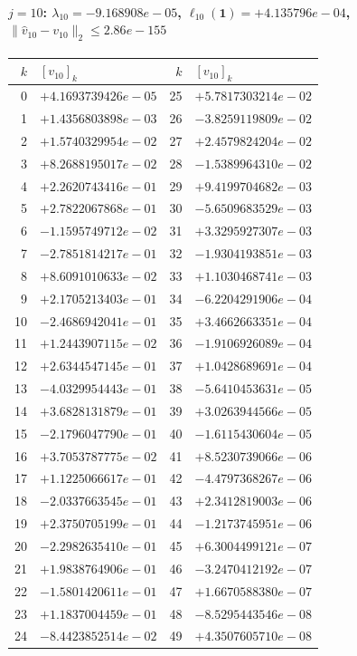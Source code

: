 \documentclass[11pt]{article}
\begin{document}
\paragraph{$j = 10$: $\lambda_{10} = -9.168908e-05$, \quad $\ell_{10}(\mathbf{1}) = +4.135796e-04$, \quad $\|\hat{v}_{10} - v_{10}\|_2 \leq 2.86e-155$}
\begin{center}
{\footnotesize
\begin{tabular}{r@{\;\;}l@{\quad}r@{\;\;}l}
\toprule
$k$ & $[v_{10}]_k$ & $k$ & $[v_{10}]_k$ \\
\midrule
0 & $+4.1693739426e-05$ & 25 & $+5.7817303214e-02$ \\
1 & $+1.4356803898e-03$ & 26 & $-3.8259119809e-02$ \\
2 & $+1.5740329954e-02$ & 27 & $+2.4579824204e-02$ \\
3 & $+8.2688195017e-02$ & 28 & $-1.5389964310e-02$ \\
4 & $+2.2620743416e-01$ & 29 & $+9.4199704682e-03$ \\
5 & $+2.7822067868e-01$ & 30 & $-5.6509683529e-03$ \\
6 & $-1.1595749712e-02$ & 31 & $+3.3295927307e-03$ \\
7 & $-2.7851814217e-01$ & 32 & $-1.9304193851e-03$ \\
8 & $+8.6091010633e-02$ & 33 & $+1.1030468741e-03$ \\
9 & $+2.1705213403e-01$ & 34 & $-6.2204291906e-04$ \\
10 & $-2.4686942041e-01$ & 35 & $+3.4662663351e-04$ \\
11 & $+1.2443907115e-02$ & 36 & $-1.9106926089e-04$ \\
12 & $+2.6344547145e-01$ & 37 & $+1.0428689691e-04$ \\
13 & $-4.0329954443e-01$ & 38 & $-5.6410453631e-05$ \\
14 & $+3.6828131879e-01$ & 39 & $+3.0263944566e-05$ \\
15 & $-2.1796047790e-01$ & 40 & $-1.6115430604e-05$ \\
16 & $+3.7053787775e-02$ & 41 & $+8.5230739066e-06$ \\
17 & $+1.1225066617e-01$ & 42 & $-4.4797368267e-06$ \\
18 & $-2.0337663545e-01$ & 43 & $+2.3412819003e-06$ \\
19 & $+2.3750705199e-01$ & 44 & $-1.2173745951e-06$ \\
20 & $-2.2982635410e-01$ & 45 & $+6.3004499121e-07$ \\
21 & $+1.9838764906e-01$ & 46 & $-3.2470412192e-07$ \\
22 & $-1.5801420611e-01$ & 47 & $+1.6670588380e-07$ \\
23 & $+1.1837004459e-01$ & 48 & $-8.5295443546e-08$ \\
24 & $-8.4423852514e-02$ & 49 & $+4.3507605710e-08$ \\
\bottomrule
\end{tabular}
}
\end{center}
\end{document}
